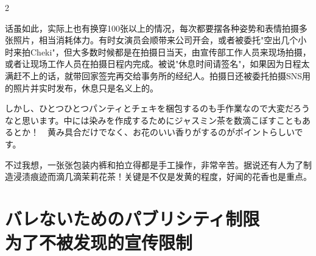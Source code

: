 \documentclass[12pt,UTF8]{ctexbook}
\begin{document}
\begin{paracol}{2}
\switchcolumn

话虽如此，实际上也有换穿100张以上的情况，每次都要摆各种姿势和表情拍摄多张照片，相当消耗体力。有时女演员会顺带来公司开会，或者被委托"空出几个小时来拍Cheki"，但大多数时候都是在拍摄日当天，由宣传部工作人员来现场拍摄，或者让现场工作人员在拍摄日程内完成。被说"休息时间请签名"，如果因为日程太满赶不上的话，就带回家签完再交给事务所的经纪人。拍摄日还被委托拍摄SNS用的照片并实时发布，休息只是名义上的。

\switchcolumn*

しかし、ひとつひとつパンティとチェキを梱包するのも手作業なので大変だろうなと思います。中には染みを作成するためにジャスミン茶を数滴こぼすこともあるとか！　黄み具合だけでなく、お花のいい香りがするのがポイントらしいです。

\switchcolumn

不过我想，一张张包装内裤和拍立得都是手工操作，非常辛苦。据说还有人为了制造浸渍痕迹而滴几滴茉莉花茶！关键是不仅是发黄的程度，好闻的花香也是重点。

\end{paracol}

\section{バレないためのパブリシティ制限\\为了不被发现的宣传限制}
\end{document}
